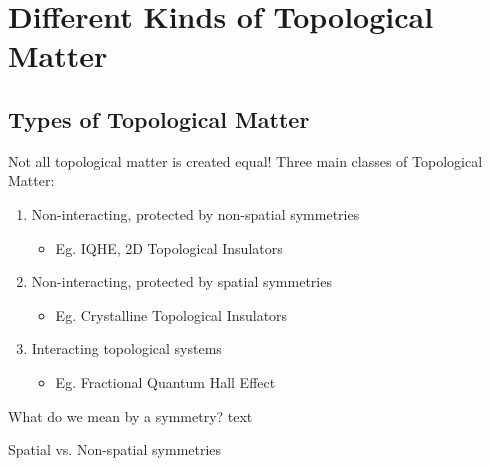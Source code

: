 \documentclass[12pt, aspectratio=169]{beamer}
\begin{document}
\section{Different Kinds of Topological Matter}

\subsection{Types of Topological Matter}
\begin{frame}{Not all topological matter is created equal!}
    Three main classes of Topological Matter:
    \vskip 0.25cm
    \begin{enumerate}
        \item <2->Non-interacting, protected by non-spatial symmetries
        \begin{itemize}
            \item <3->{Eg. IQHE, 2D Topological Insulators}
        \end{itemize}
        \vskip 0.25cm
        
        \item <4->Non-interacting, protected by spatial symmetries
        \begin{itemize}
            \item <5->{Eg. Crystalline Topological Insulators}
        \end{itemize}
        \vskip 0.25cm
        
        \item <6->Interacting topological systems
        \begin{itemize}
            \item <7->{Eg. Fractional Quantum Hall Effect}
        \end{itemize}
    \end{enumerate} 
    \vskip 0.25cm
\end{frame}




\begin{frame}{What do we mean by a symmetry?}
    text
\end{frame}

\begin{frame}{Spatial vs. Non-spatial symmetries}
    
\end{frame}
\end{document}
